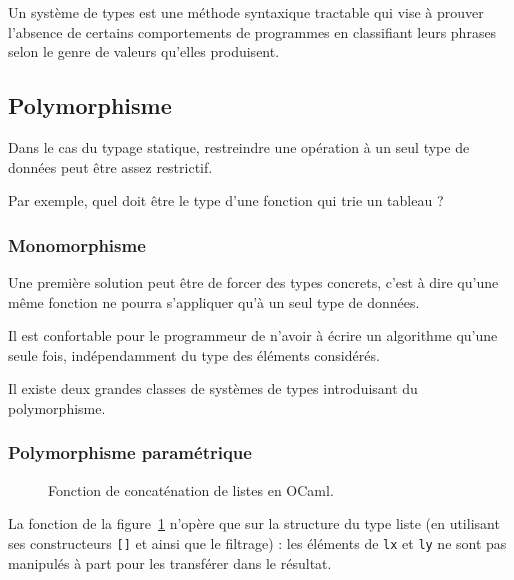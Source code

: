 \begin{definition}
Un système de types est une méthode syntaxique tractable qui vise à prouver
l'absence de certains comportements de programmes en classifiant leurs phrases
selon le genre de valeurs qu'elles produisent. \cite{TAPL}
\end{definition}

\subsection{Polymorphisme}

Dans le cas du typage statique, restreindre une opération à un seul type de
données peut être assez restrictif.

Par exemple, quel doit être le type d'une fonction qui trie un tableau ?

\subsubsection{Monomorphisme}

Une première solution peut être de forcer des types concrets, c'est à dire
qu'une même fonction ne pourra s'appliquer qu'à un seul type de données.

Il est confortable pour le programmeur de n'avoir à écrire un algorithme qu'une
seule fois, indépendamment du type des éléments considérés.

Il existe deux grandes classes de systèmes de types introduisant du
polymorphisme.

\subsubsection{Polymorphisme paramétrique}

\cite{Milner78}

\cite{PascalNoEscape}

\begin{figure}
  \caption{Fonction de concaténation de listes en OCaml.}
  \label{fig:listappend}
\end{figure}

La fonction de la figure~\ref{fig:listappend} n'opère que sur la structure du type
liste (en utilisant ses constructeurs \texttt{{[}{]}} et \listcons ainsi que
le filtrage) : les éléments de \texttt{lx} et \texttt{ly} ne sont pas manipulés
à part pour les transférer dans le résultat.

